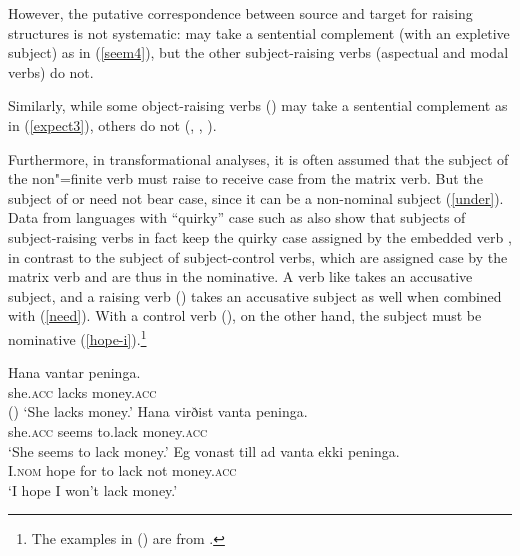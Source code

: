 \noindent
However, the putative correspondence between source and target for raising structures is not
systematic:  may take a sentential complement (with an expletive subject) as in
(\ref{seem4}), but the other subject-raising verbs (aspectual and modal verbs) do not.

\eal
{}
\zl
 
 \noindent
 Similarly, while some object-raising verbs () may take a sentential complement as in (\ref{expect3}), others do not (, , ).
 
\eal
{}
\zl

Furthermore, in transformational analyses, it is often assumed that the subject of the non"=finite verb must raise to receive case from the matrix verb.
 But the subject of  or  need not bear case, since it can be a non-nominal subject (\ref{under}).
Data from languages with ``quirky'' case such as  also show that subjects of
subject-raising verbs in fact keep the quirky case assigned by the embedded verb
\citep{Zaenenetal1985}\addpages, in contrast to the subject of subject-control verbs, which are assigned
case by the matrix verb and are thus in the nominative. A verb like  takes an accusative
subject, and a raising verb () takes an accusative subject as well when combined with
 (\ref{need}). With a control verb (), on the other hand, the subject must be
nominative (\ref{hope-i}).\footnote{
The examples in () are from  .
}

\eal
\ex 
\gll Hana             vantar peninga.\\
     she.\textsc{acc} lacks  money.\textsc{acc} \\\hfill()
\glt `She lacks money.'
\ex 
\gll Hana             virðist vanta   peninga.\label{need} \\
     she.\textsc{acc} seems   to.lack money.\textsc{acc} \\
\glt `She seems to lack money.'
\ex 
\gll Eg             vonast till ad vanta ekki peninga. \label{hope-i} \\
     I.\textsc{nom} hope   for  to lack  not  money.\textsc{acc} \\
\glt `I hope I won't lack money.'
\zl

